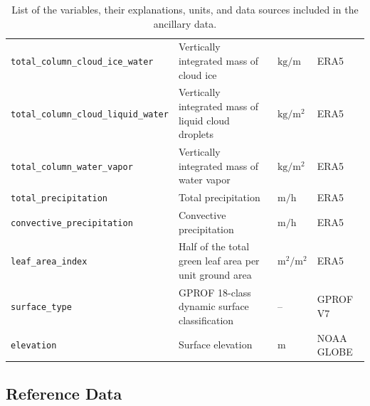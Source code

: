 \documentclass[11pt]{article}
\begin{document}
\begin{table}[htbp]
\begin{tabular}{lp{4cm}ll}
		\texttt{total\_column\_cloud\_ice\_water}    & Vertically integrated mass of cloud ice                & $\si{\kilo \gram \per \meter}$              & ERA5            \\
		\texttt{total\_column\_cloud\_liquid\_water} & Vertically integrated mass of liquid cloud droplets    & $\si{\kilo \gram \per \meter \squared}$     & ERA5            \\
		\texttt{total\_column\_water\_vapor}         & Vertically integrated mass of water vapor              & $\si{\kilo \gram \per \meter \squared}$     & ERA5            \\
		\texttt{total\_precipitation}                & Total precipitation                                    & $\si{\meter \per \hour}$                    & ERA5            \\
		\texttt{convective\_precipitation}           & Convective precipitation                               & $\si{\meter \per \hour}$                    & ERA5            \\
		\texttt{leaf\_area\_index}                   & Half of the total green leaf area per unit ground area & $\si{\meter \squared \per \meter \squared}$ & ERA5            \\
		\texttt{surface\_type}                       & GPROF 18-class dynamic surface classification          & --                                          & GPROF V7        \\
		\texttt{elevation}                           & Surface elevation                                      & $\si{\meter}$                               & NOAA GLOBE      \\
		\bottomrule
	\end{tabular}
	\caption{List of the variables, their explanations, units, and data sources included in the ancillary data.}
	\label{tab:ancillary}
\end{table}


\subsection{Reference Data}
\end{document}
